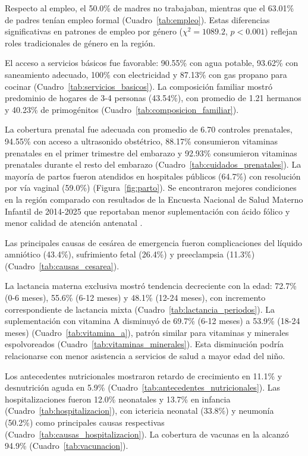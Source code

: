 Respecto al empleo, el 50.0\% de madres no trabajaban, mientras que el 63.01\% 
de padres tenían empleo formal (Cuadro~\ref{tab:empleo}). Estas diferencias 
significativas en patrones de empleo por género ($\chi^2 = 1089.2$, 
$p < 0.001$) reflejan roles tradicionales de género en la región.

El acceso a servicios básicos fue favorable: 90.55\% con agua potable, 93.62\% 
con saneamiento adecuado, 100\% con electricidad y 87.13\% con gas propano 
para cocinar (Cuadro~\ref{tab:servicios_basicos}). La composición familiar 
mostró predominio de hogares de 3-4 personas (43.54\%), con promedio de 1.21 
hermanos y 40.23\% de primogénitos (Cuadro~\ref{tab:composicion_familiar}).

La cobertura prenatal fue adecuada con promedio de 6.70 controles prenatales, 
94.55\% con acceso a ultrasonido obstétrico, 88.17\% consumieron vitaminas
prenatales en el primer trimestre del embarazo y 92.93\% consumieron vitaminas
prenatales durante el resto del embarazo (Cuadro~\ref{tab:cuidados_prenatales}). 
La mayoría de partos fueron atendidos en hospitales públicos (64.7\%) con 
resolución por vía vaginal (59.0\%) (Figura~\ref{fig:parto}). Se encontraron mejores condiciones en la región comparado con resultados de la Encuesta Nacional de Salud Materno Infantil de 2014-2025 que reportaban menor suplementación con ácido fólico y menor calidad de atención antenatal \cite{Santos2025}.

Las principales causas de cesárea de emergencia fueron complicaciones del 
líquido amniótico (43.4\%), sufrimiento fetal (26.4\%) y preeclampsia (11.3\%) 
(Cuadro~\ref{tab:causas_cesarea}).

La lactancia materna exclusiva mostró tendencia decreciente con la edad: 72.7\% 
(0-6 meses), 55.6\% (6-12 meses) y 48.1\% (12-24 meses), con incremento 
correspondiente de lactancia mixta (Cuadro~\ref{tab:lactancia_periodos}). La 
suplementación con vitamina A disminuyó de 69.7\% (6-12 meses) a 53.9\% 
(18-24 meses) (Cuadro~\ref{tab:vitamina_a}), patrón similar para vitaminas y 
minerales espolvoreados (Cuadro~\ref{tab:vitaminas_minerales}). Esta 
disminución podría relacionarse con menor asistencia a servicios de salud a 
mayor edad del niño.

Los antecedentes nutricionales mostraron retardo de crecimiento en 11.1\% y 
desnutrición aguda en 5.9\% (Cuadro~\ref{tab:antecedentes_nutricionales}). 
Las hospitalizaciones fueron 12.0\% neonatales y 13.7\% en infancia 
(Cuadro~\ref{tab:hospitalizacion}), con ictericia neonatal (33.8\%) y neumonía 
(50.2\%) como principales causas respectivas 
(Cuadro~\ref{tab:causas_hospitalizacion}). La cobertura de vacunas en la alcanzó
94.9\% (Cuadro~\ref{tab:vacunacion}).

